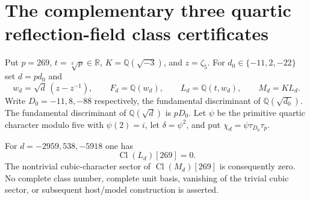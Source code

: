 \section{The complementary three quartic reflection-field class certificates}
\label{sec:cubic-three-ramified-quartic-class-certificates}

Put $p=269$, $t=\sqrt[3]{p}\in\mathbb R$, $K=\mathbb Q(\sqrt{-3})$,
and $z=\zeta_5$.  For $d_0\in\{-11,2,-22\}$ set $d=pd_0$ and
\[
 w_d=\sqrt d\,(z-z^{-1}),\qquad F_d=\mathbb Q(w_d),\qquad
 L_d=\mathbb Q(t,w_d),\qquad M_d=KL_d.
 \tag{G137.1}
\]
Write $D_0=-11,8,-88$ respectively, the fundamental discriminant
of $\mathbb Q(\sqrt{d_0})$.  The fundamental discriminant of
$\mathbb Q(\sqrt d)$ is $pD_0$.
Let $\psi$ be the primitive quartic character modulo five with
$\psi(2)=i$, let $\delta=\psi^2$, and put
$\chi_d=\psi\tau_{D_0}\tau_p$.

\begin{theorem}
\label{AC-G137-ramified-quartic-classes}
For $d=-2959,538,-5918$ one has
\[
                    \operatorname{Cl}(L_d)[269]=0.
 \tag{G137.2}
\]
The nontrivial cubic-character sector of
$\operatorname{Cl}(M_d)[269]$ is consequently zero.
No complete class number, complete unit basis, vanishing of the
trivial cubic sector, or subsequent host/model construction is asserted.
\end{theorem}

